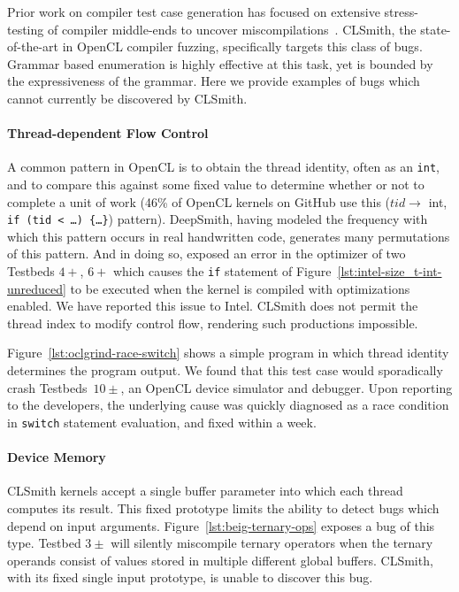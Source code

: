 Prior work on compiler test case generation has focused on extensive stress-testing of compiler middle-ends to uncover miscompilations~\cite{Chen2014a}. CLSmith, the state-of-the-art in OpenCL compiler fuzzing, specifically targets this class of bugs. Grammar based enumeration is highly effective at this task, yet is bounded by the expressiveness of the grammar. Here we provide examples of bugs which cannot currently be discovered by CLSmith.

%
\paragraph{Thread-dependent Flow Control} A common pattern in OpenCL is to obtain the thread identity, often as an \texttt{int}, and to compare this against some fixed value to determine whether or not to complete a unit of work (46\% of OpenCL kernels on GitHub use this ($tid \rightarrow$ int, \texttt{if (tid < \ldots) \{\ldots\}}) pattern). DeepSmith, having modeled the frequency with which this pattern occurs in real handwritten code, generates many permutations of this pattern. And in doing so, exposed an error in the optimizer of two Testbeds $4+$, $6+$ which causes the \texttt{if} statement of Figure~\ref{lst:intel-size_t-int-unreduced} to be executed when the kernel is compiled with optimizations enabled. We have reported this issue to Intel. CLSmith does not permit the thread index to modify control flow, rendering such productions impossible.

Figure~\ref{lst:oclgrind-race-switch} shows a simple program in which thread identity determines the program output. We found that this test case would sporadically crash Testbeds~$10\pm$, an OpenCL device simulator and debugger. Upon reporting to the developers, the underlying cause was quickly diagnosed as a race condition in \texttt{switch} statement evaluation, and fixed within a week.

\paragraph{Device Memory} CLSmith kernels accept a single buffer parameter into which each thread computes its result. This fixed prototype limits the ability to detect bugs which depend on input arguments. Figure~\ref{lst:beig-ternary-ops} exposes a bug of this type. Testbed $3\pm$ will silently miscompile ternary operators when the ternary operands consist of values stored in multiple different global buffers. CLSmith, with its fixed single input prototype, is unable to discover this bug. %

